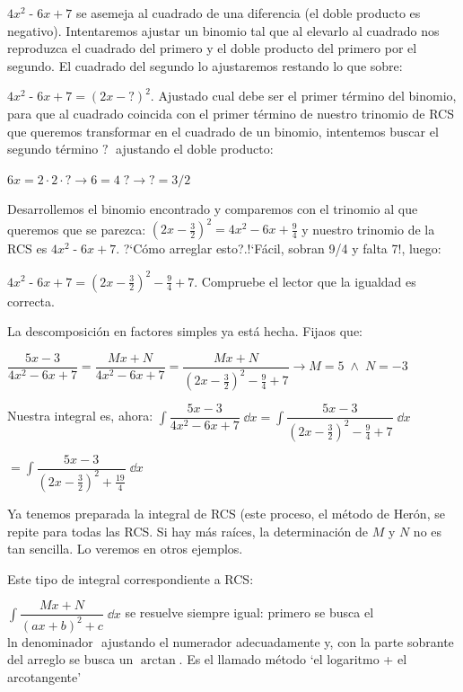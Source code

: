 {\begin{ejem}
$4x^2\; \textbf{-}\; 6x+7$ se asemeja al cuadrado de una diferencia (el doble producto es negativo). Intentaremos ajustar un binomio tal que al elevarlo al cuadrado nos reproduzca el cuadrado del primero y el doble producto del primero por el segundo. El cuadrado del segundo lo ajustaremos restando lo que sobre:

$4x^2\; \textbf{-}\; 6x+7= (2x -  \boxed { ? } )^2$. Ajustado cual debe ser el primer término del binomio, para que al cuadrado coincida con el primer término de nuestro trinomio de RCS que queremos transformar en el cuadrado de un binomio, intentemos buscar el segundo término $ \boxed { ? } \; $ ajustando el doble producto:

$6x=2\cdot 2\cdot  \boxed { ? } \to 6=4 \;  \boxed { ? } \to  \boxed { ? } = 3/2$

Desarrollemos el binomio encontrado y comparemos con el trinomio al que queremos que se parezca:  $(2x-\frac 3 2)^2=4x^2-6x+\frac 9 4$ y nuestro trinomio de la RCS es $4x^2\; \textbf{-}\; 6x+7$.  ?`Cómo arreglar esto?.!`Fácil, sobran 9/4 y falta 7!, luego:

 $4x^2\; \textbf{-}\; 6x+7= (2x-\frac 3 2 )^2 -\frac 9 4 + 7$. Compruebe el lector que la igualdad es correcta.
 
 La descomposición en factores simples ya está hecha. Fijaos que: 
 
 $\dfrac {5x-3}{4x^2-6x+7}= \dfrac {Mx+N}{4x^2-6x+7}=\dfrac {Mx+N}{(2x-\frac 3 2 )^2 -\frac 9 4 + 7} \to M=5 \; \wedge \; N=-3$
 
 Nuestra integral es, ahora:  $\displaystyle \int \dfrac {5x-3}{4x^2-6x+7}\; \dd x = \int \dfrac {5x-3}{(2x-\frac 3 2 )^2 -\frac 9 4 + 7} \; \dd x $
 
 $ = \int \dfrac {5x-3}{(2x-\frac 3 2 )^2 + \frac {19} {4}} \; \dd x$
 
 Ya tenemos preparada la integral de RCS (este proceso, el método de Herón, se repite para todas las RCS. Si hay más raíces, la determinación de $M$ y $N$ no es tan sencilla. Lo veremos en otros ejemplos.
 
 Este tipo de integral correspondiente a RCS: 
 
 $\displaystyle \int \dfrac {Mx+N} {(ax+b)^2+c} \; \dd x$ se resuelve siempre igual: primero se busca el $\mathrm{ln}\text { denominador }$  ajustando el numerador adecuadamente y, con la parte sobrante del arreglo se busca un $\arctan$. Es el llamado método `el  logaritmo + el arcotangente'
 

\end{ejem}}
